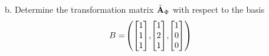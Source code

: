 \documentclass[11pt]{article}
\begin{document}
\begin{enumerate}
\begin{enumerate}
              \item[b.] Determine the transformation matrix $\tilde{\mathbf{A}}_\Phi$ with respect to the basis
                    \[
                        B = \!\left(
                            \begin{bmatrix} 1 \\ 1 \\ 1 \end{bmatrix}\!,\!
                            \begin{bmatrix} 1 \\ 2 \\ 1 \end{bmatrix}\!,\!
                            \begin{bmatrix} 1 \\ 0 \\ 0 \end{bmatrix}
                        \right)
                    \]


\end{enumerate}
\end{enumerate}
\end{document}
